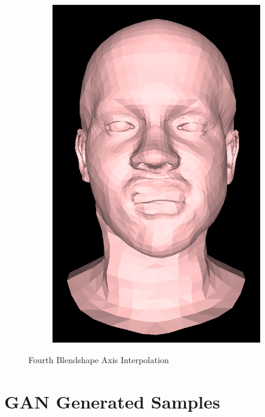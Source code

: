 \begin{figure}[h]
\begin{subfigure}[b]{0.24\textwidth}
        \includegraphics[width=\textwidth]{figures/blendshape_interp/4/00004.png}
    \end{subfigure}
    \caption{Fourth Blendshape Axis Interpolation}\label{fig:Blendshape_axis_4}
\end{figure}

\section*{GAN Generated Samples}

